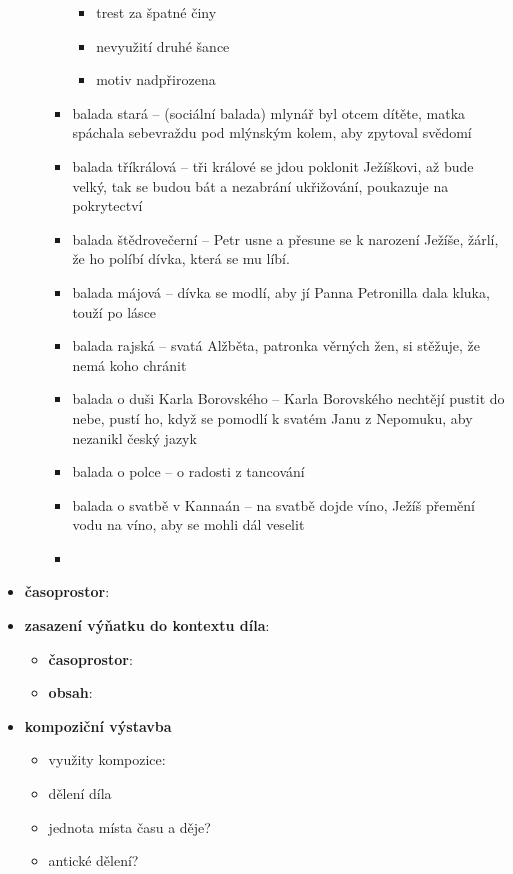 \documentclass[10pt,a4paper]{article}
\begin{document}
\begin{itemize}
\begin{itemize}
\begin{itemize}
\begin{itemize}
			\item trest za špatné činy
			\item nevyužití druhé šance
			\item motiv nadpřirozena
			\end{itemize}
		\item balada stará -- (sociální balada) mlynář byl otcem dítěte, matka spáchala sebevraždu pod mlýnským kolem, aby zpytoval svědomí
		\item balada tříkrálová -- tři králové se jdou poklonit Ježíškovi, až bude velký, tak se budou bát a nezabrání ukřižování, poukazuje na pokrytectví
		\item balada štědrovečerní -- Petr usne a přesune se k narození Ježíše, žárlí, že ho políbí dívka, která se mu líbí.
		\item balada májová -- dívka se modlí, aby jí Panna Petronilla dala kluka, touží po lásce
		\item balada rajská -- svatá Alžběta, patronka věrných žen, si stěžuje, že nemá koho chránit
		\item balada o duši Karla Borovského -- Karla Borovského nechtějí pustit do nebe, pustí ho, když se pomodlí k svatém Janu z Nepomuku, aby nezanikl český jazyk
		\item balada o polce -- o radosti z tancování
		\item balada o svatbě v Kannaán -- na svatbě dojde víno, Ježíš přemění vodu na víno, aby se mohli dál veselit
		\item 
		\end{itemize}
	\end{itemize}
\item \textbf{časoprostor}:
\item \textbf{zasazení výňatku do kontextu díla}:
	\begin{itemize}
	\item \textbf{časoprostor}:
	\item \textbf{obsah}: 
	\end{itemize}
\item \textbf{kompoziční výstavba}
	\begin{itemize}
	\item využity kompozice: 
	\item dělení díla
	\item jednota místa času a děje?
	\item antické dělení?
	\end{itemize}
\end{itemize}
\end{document}
